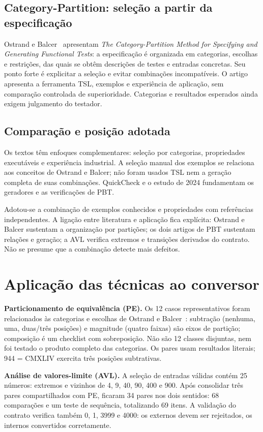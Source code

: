 \documentclass[11pt,a4paper]{article}
\begin{document}
\subsection{Category-Partition: seleção a partir da especificação}
Ostrand e Balcer~\cite{category} apresentam \emph{The Category-Partition Method for Specifying and Generating Functional Tests}: a especificação é organizada em categorias, escolhas e restrições, das quais se obtêm descrições de testes e entradas concretas. Seu ponto forte é explicitar a seleção e evitar combinações incompatíveis. O artigo apresenta a ferramenta TSL, exemplos e experiência de aplicação, sem comparação controlada de superioridade. Categorias e resultados esperados ainda exigem julgamento do testador.

\subsection{Comparação e posição adotada}
Os textos têm enfoques complementares: seleção por categorias, propriedades executáveis e experiência industrial. A seleção manual dos exemplos se relaciona aos conceitos de Ostrand e Balcer; não foram usados TSL nem a geração completa de suas combinações. QuickCheck e o estudo de 2024 fundamentam os geradores e as verificações de PBT.

Adotou-se a combinação de exemplos conhecidos e propriedades com referências independentes. A ligação entre literatura e aplicação fica explícita: Ostrand e Balcer sustentam a organização por partições; os dois artigos de PBT sustentam relações e geração; a AVL verifica extremos e transições derivados do contrato. Não se presume que a combinação detecte mais defeitos.

\section{Aplicação das técnicas ao conversor}
\textbf{Particionamento de equivalência (PE).} Os 12 casos representativos foram relacionados às categorias e escolhas de Ostrand e Balcer~\cite{category}: subtração (nenhuma, uma, duas/três posições) e magnitude (quatro faixas) são eixos de partição; composição é um checklist com sobreposição. Não são 12 classes disjuntas, nem foi testado o produto completo das categorias. Os pares usam resultados literais; 944 = CMXLIV exercita três posições subtrativas.

\textbf{Análise de valores-limite (AVL).} A seleção de entradas válidas contém 25 números: extremos e vizinhos de 4, 9, 40, 90, 400 e 900. Após consolidar três pares compartilhados com PE, ficaram 34 pares nos dois sentidos: 68 comparações e um teste de sequência, totalizando 69 itens. A validação do contrato verifica também 0, 1, 3999 e 4000: os externos devem ser rejeitados, os internos convertidos corretamente.
\end{document}
